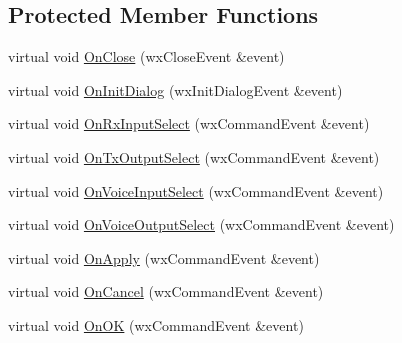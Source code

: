 \subsection*{Protected Member Functions}
\begin{DoxyCompactItemize}
\item 
virtual void \hyperlink{class_dlg_audio_a3d19dbabda45d63849c95f9202d9ee56}{On\-Close} (wx\-Close\-Event \&event)
\item 
virtual void \hyperlink{class_dlg_audio_a4005f4224055bd5c8767e9e4d2296c26}{On\-Init\-Dialog} (wx\-Init\-Dialog\-Event \&event)
\item 
virtual void \hyperlink{class_dlg_audio_a6981a966c4e04931511d9a0fad482591}{On\-Rx\-Input\-Select} (wx\-Command\-Event \&event)
\item 
virtual void \hyperlink{class_dlg_audio_a2da73ea801464d515f0b4ea01dec3aeb}{On\-Tx\-Output\-Select} (wx\-Command\-Event \&event)
\item 
virtual void \hyperlink{class_dlg_audio_a9c9848d90d805216ad52aad9443bffd8}{On\-Voice\-Input\-Select} (wx\-Command\-Event \&event)
\item 
virtual void \hyperlink{class_dlg_audio_a337f1badd157dcdb9950e14033527f4a}{On\-Voice\-Output\-Select} (wx\-Command\-Event \&event)
\item 
virtual void \hyperlink{class_dlg_audio_a245e1317e52c8eeced77fcff2e6e2812}{On\-Apply} (wx\-Command\-Event \&event)
\item 
virtual void \hyperlink{class_dlg_audio_a68cb1a16f03fbb7af8d6ac0e7d5ba686}{On\-Cancel} (wx\-Command\-Event \&event)
\item 
virtual void \hyperlink{class_dlg_audio_a86b960dabc5dae9f8cf4946d562330bd}{On\-O\-K} (wx\-Command\-Event \&event)
\end{DoxyCompactItemize}
